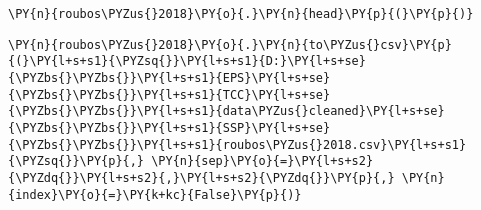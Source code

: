     \begin{tcolorbox}[breakable, size=fbox, boxrule=1pt, pad at break*=1mm,colback=cellbackground, colframe=cellborder]
\begin{Verbatim}[commandchars=\\\{\}]
\PY{n}{roubos\PYZus{}2018}\PY{o}{.}\PY{n}{head}\PY{p}{(}\PY{p}{)}
\end{Verbatim}
\end{tcolorbox}

    \begin{tcolorbox}[breakable, size=fbox, boxrule=1pt, pad at break*=1mm,colback=cellbackground, colframe=cellborder]
\begin{Verbatim}[commandchars=\\\{\}]
\PY{n}{roubos\PYZus{}2018}\PY{o}{.}\PY{n}{to\PYZus{}csv}\PY{p}{(}\PY{l+s+s1}{\PYZsq{}}\PY{l+s+s1}{D:}\PY{l+s+se}{\PYZbs{}\PYZbs{}}\PY{l+s+s1}{EPS}\PY{l+s+se}{\PYZbs{}\PYZbs{}}\PY{l+s+s1}{TCC}\PY{l+s+se}{\PYZbs{}\PYZbs{}}\PY{l+s+s1}{data\PYZus{}cleaned}\PY{l+s+se}{\PYZbs{}\PYZbs{}}\PY{l+s+s1}{SSP}\PY{l+s+se}{\PYZbs{}\PYZbs{}}\PY{l+s+s1}{roubos\PYZus{}2018.csv}\PY{l+s+s1}{\PYZsq{}}\PY{p}{,} \PY{n}{sep}\PY{o}{=}\PY{l+s+s2}{\PYZdq{}}\PY{l+s+s2}{,}\PY{l+s+s2}{\PYZdq{}}\PY{p}{,} \PY{n}{index}\PY{o}{=}\PY{k+kc}{False}\PY{p}{)}
\end{Verbatim}
\end{tcolorbox}